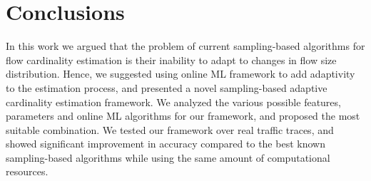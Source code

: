 \section{Conclusions} \label{sec:conclusions}
	
		In this work we argued that the problem of current sampling-based algorithms for flow cardinality estimation is their inability to adapt to changes in flow size distribution. Hence, we suggested using online ML framework to add adaptivity to the estimation process, and presented a novel sampling-based adaptive cardinality estimation framework. We analyzed the various possible features, parameters and online ML algorithms for our framework, and proposed the most suitable combination. We tested our framework over real traffic traces, and showed significant improvement in accuracy compared to the best known sampling-based algorithms while using the same amount of computational resources.
	
